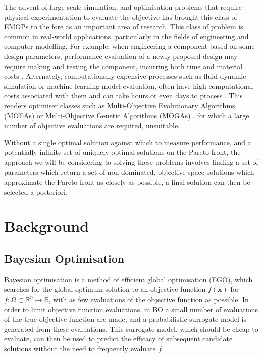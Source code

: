 \documentclass[runningheads]{llncs}
\begin{document}
The advent of large-scale simulation, and optimisation problems that require physical experimentation to evaluate the objective has brought this class of EMOPs to the fore as an important area of research. This class of problem is common in real-world applications, particularly in the fields of engineering and computer modelling. For example, when engineering a component based on some design parameters, performance evaluation of a newly proposed design may require making and testing the component, incurring both time and material costs \cite{fang2017design}. Alternately, computationally expensive processes such as fluid dynamic simulation or machine learning model evaluation, often have high computational costs associated with them and can take hours or even days to process \cite{huband2005scalable}. This renders optimiser classes such as Multi-Objective Evolutionary Algorithms (MOEAs) \cite{tanabe2017benchmarking,coello2007evolutionary} or Multi-Objective Genetic Algorithms (MOGAs) \cite{tamaki1996multi}, for which a large number of objective evaluations are required, unsuitable. 

Without a single optimal solution against which to measure performance, and a potentially infinite set of uniquely optimal solutions on the Pareto front, the approach we will be considering to solving these problems involves finding a set of parameters which return a set of non-dominated, objective-space solutions which approximate the Pareto front as closely as possible, a final solution can then be selected a posteriori. 

\section{Background}
\subsection{Bayesian Optimisation}\label{section:background_BayesianOptimisation}
Bayesian optimisation is a method of efficient global optimisation (EGO), which searches for the global optimum
solution to an objective function $f(\mathbf{x})$ for  $f: \Omega \subset \mathbb{R}^{n} \mapsto \mathbb{R}$, with as few evaluations of the objective function as possible. In order to limit objective function evaluations, in BO a small number of evaluations of the true objective function are made, and a probabilistic surrogate model is generated from these evaluations. This surrogate model, which should be cheap to evaluate, can then be used to predict the efficacy of subsequent candidate solutions without the need to frequently evaluate $f$. 
\end{document}
